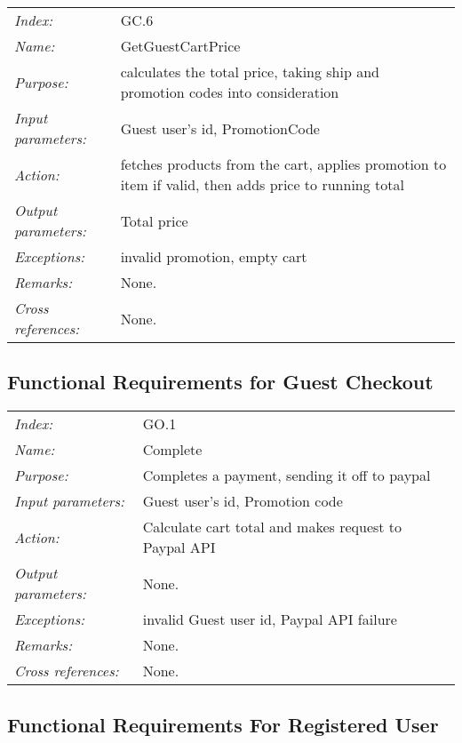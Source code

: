 \documentclass[10pt,letter]{article}
\begin{document}
\begin{tabularx}{\textwidth}{l X}
    \it{Index:} & GC.6 \\
    \it{Name:} & GetGuestCartPrice \\
    \it{Purpose:} & calculates the total price, taking ship and promotion codes into consideration \\
    \it{Input parameters:} & Guest user's id, PromotionCode \\
    \it{Action:} &  fetches products from the cart, applies promotion to item if valid, then adds price to running total\\
    \it{Output parameters:} & Total price  \\
    \it{Exceptions:} &  invalid promotion, empty cart\\
    \it{Remarks:} & None. \\
    \it{Cross references:} & None. \\
    \hline
\end{tabularx}

\subsection{Functional Requirements for Guest Checkout}

\begin{tabularx}{\textwidth}{l X}
    \it{Index:} & GO.1 \\
    \it{Name:} & Complete\\
    \it{Purpose:} & Completes a payment, sending it off to paypal\\
    \it{Input parameters:} & Guest user's id, Promotion code \\
    \it{Action:} &  Calculate cart total and makes request to Paypal API\\
    \it{Output parameters:} & None. \\
    \it{Exceptions:} & invalid Guest user id, Paypal API failure \\
    \it{Remarks:} & None. \\
    \it{Cross references:} & None. \\
    \hline
\end{tabularx}

\subsection{Functional Requirements For Registered User}
\end{document}
